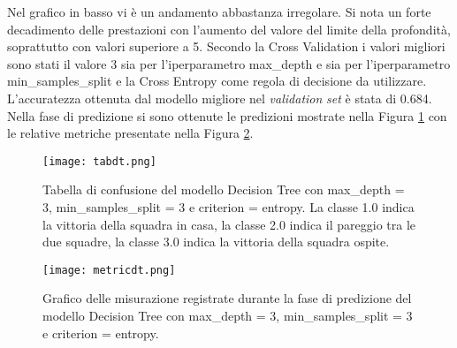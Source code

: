 Nel grafico in basso vi è un andamento abbastanza irregolare. Si nota un forte decadimento delle prestazioni con l'aumento del valore del limite della profondità, soprattutto con valori superiore a 5. Secondo la Cross Validation i valori migliori sono stati il valore 3 sia per l'iperparametro \textsf{max\_depth} e sia per l'iperparametro \textsf{min\_samples\_split} e la Cross Entropy come regola di decisione da utilizzare. L'accuratezza ottenuta dal modello migliore nel \emph{validation} \emph{set} è stata di 0.684.\\
Nella fase di predizione si sono ottenute le predizioni mostrate nella Figura \ref{fig:tabdt} con le relative metriche presentate nella Figura \ref{fig:dtmetrics}.
\begin{figure}[h]
	\begin{center}
		\texttt{[image: tabdt.png]}
		\caption{Tabella di confusione del modello Decision Tree con \textsf{max\_depth} = 3, \textsf{min\_samples\_split} = 3 e \textsf{criterion} = entropy. La classe 1.0 indica la vittoria della squadra in casa, la classe 2.0 indica il pareggio tra le due squadre, la classe 3.0 indica la vittoria della squadra ospite.
		} 
		\label{fig:tabdt}
	\end{center}
\end{figure}
\begin{figure}[]
	\begin{center}
		\texttt{[image: metricdt.png]}
		\caption{Grafico delle misurazione registrate durante la fase di predizione del modello Decision Tree con \textsf{max\_depth} = 3, \textsf{min\_samples\_split} = 3 e \textsf{criterion} = entropy.
		} 
		\label{fig:dtmetrics}
	\end{center}
\end{figure}
